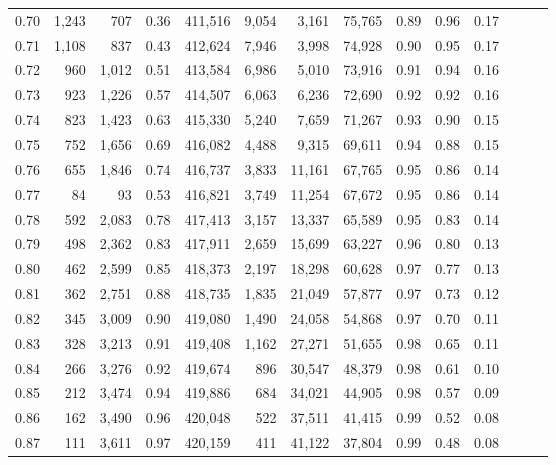 \begin{tabular}{rrrrrrrrrrrrrr}
0.70 &   1,243 &    707 &  0.36 &  411,516 &    9,054 &   3,161 &  75,765 &  0.89 &  0.96 &      0.17 \\
0.71 &   1,108 &    837 &  0.43 &  412,624 &    7,946 &   3,998 &  74,928 &  0.90 &  0.95 &      0.17 \\
0.72 &     960 &  1,012 &  0.51 &  413,584 &    6,986 &   5,010 &  73,916 &  0.91 &  0.94 &      0.16 \\
0.73 &     923 &  1,226 &  0.57 &  414,507 &    6,063 &   6,236 &  72,690 &  0.92 &  0.92 &      0.16 \\
0.74 &     823 &  1,423 &  0.63 &  415,330 &    5,240 &   7,659 &  71,267 &  0.93 &  0.90 &      0.15 \\
0.75 &     752 &  1,656 &  0.69 &  416,082 &    4,488 &   9,315 &  69,611 &  0.94 &  0.88 &      0.15 \\
0.76 &     655 &  1,846 &  0.74 &  416,737 &    3,833 &  11,161 &  67,765 &  0.95 &  0.86 &      0.14 \\
0.77 &      84 &     93 &  0.53 &  416,821 &    3,749 &  11,254 &  67,672 &  0.95 &  0.86 &      0.14 \\
0.78 &     592 &  2,083 &  0.78 &  417,413 &    3,157 &  13,337 &  65,589 &  0.95 &  0.83 &      0.14 \\
0.79 &     498 &  2,362 &  0.83 &  417,911 &    2,659 &  15,699 &  63,227 &  0.96 &  0.80 &      0.13 \\
0.80 &     462 &  2,599 &  0.85 &  418,373 &    2,197 &  18,298 &  60,628 &  0.97 &  0.77 &      0.13 \\
0.81 &     362 &  2,751 &  0.88 &  418,735 &    1,835 &  21,049 &  57,877 &  0.97 &  0.73 &      0.12 \\
0.82 &     345 &  3,009 &  0.90 &  419,080 &    1,490 &  24,058 &  54,868 &  0.97 &  0.70 &      0.11 \\
0.83 &     328 &  3,213 &  0.91 &  419,408 &    1,162 &  27,271 &  51,655 &  0.98 &  0.65 &      0.11 \\
0.84 &     266 &  3,276 &  0.92 &  419,674 &      896 &  30,547 &  48,379 &  0.98 &  0.61 &      0.10 \\
0.85 &     212 &  3,474 &  0.94 &  419,886 &      684 &  34,021 &  44,905 &  0.98 &  0.57 &      0.09 \\
0.86 &     162 &  3,490 &  0.96 &  420,048 &      522 &  37,511 &  41,415 &  0.99 &  0.52 &      0.08 \\
0.87 &     111 &  3,611 &  0.97 &  420,159 &      411 &  41,122 &  37,804 &  0.99 &  0.48 &      0.08 \\

\end{tabular}
